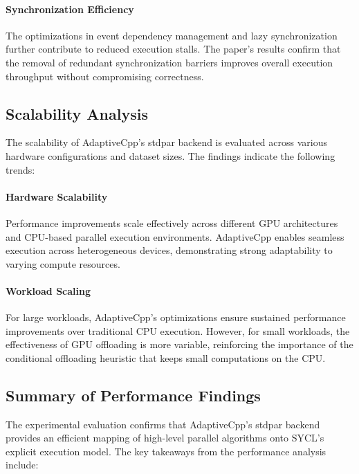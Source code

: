 \paragraph{Synchronization Efficiency}
The optimizations in event dependency management and lazy synchronization further contribute to reduced
execution stalls. The paper’s results confirm that the removal of redundant synchronization barriers improves
overall execution throughput without compromising correctness.

\subsection{Scalability Analysis}
\label{sec:scalability_analysis}

The scalability of AdaptiveCpp’s stdpar backend is evaluated across various hardware configurations and dataset
sizes. The findings indicate the following trends:

\paragraph{Hardware Scalability}
Performance improvements scale effectively across different GPU architectures and CPU-based parallel
execution environments. AdaptiveCpp enables seamless execution across heterogeneous devices, demonstrating
strong adaptability to varying compute resources.

\paragraph{Workload Scaling}
For large workloads, AdaptiveCpp’s optimizations ensure sustained performance improvements over traditional
CPU execution. However, for small workloads, the effectiveness of GPU offloading is more variable, reinforcing
the importance of the conditional offloading heuristic that keeps small computations on the CPU.

\subsection{Summary of Performance Findings}
\label{sec:performance_summary}

The experimental evaluation confirms that AdaptiveCpp’s stdpar backend provides an efficient mapping of
high-level parallel algorithms onto SYCL’s explicit execution model. The key takeaways from the performance
analysis include:

